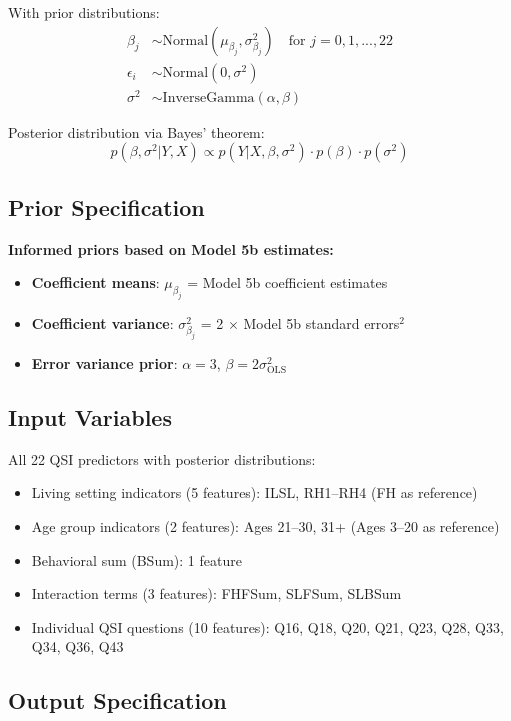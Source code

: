 With prior distributions:
\begin{align}
\beta_j &\sim \text{Normal}(\mu_{\beta_j}, \sigma^2_{\beta_j}) \quad \text{for } j = 0, 1, ..., 22 \\
\epsilon_i &\sim \text{Normal}(0, \sigma^2) \\
\sigma^2 &\sim \text{InverseGamma}(\alpha, \beta)
\end{align}

Posterior distribution via Bayes' theorem:
\begin{equation}
p(\beta, \sigma^2 | Y, X) \propto p(Y | X, \beta, \sigma^2) \cdot p(\beta) \cdot p(\sigma^2)
\end{equation}

\subsection{Prior Specification}

\textbf{Informed priors based on Model 5b estimates:}
\begin{itemize}
    \item \textbf{Coefficient means}: $\mu_{\beta_j}$ = Model 5b coefficient estimates
    \item \textbf{Coefficient variance}: $\sigma^2_{\beta_j}$ = 2 $\times$ Model 5b standard errors$^2$
    \item \textbf{Error variance prior}: $\alpha = 3$, $\beta = 2\sigma^2_{\text{OLS}}$
\end{itemize}

\subsection{Input Variables}

All 22 QSI predictors with posterior distributions:
\begin{itemize}
    \item Living setting indicators (5 features): ILSL, RH1--RH4 (FH as reference)
    \item Age group indicators (2 features): Ages 21--30, 31+ (Ages 3--20 as reference)
    \item Behavioral sum (BSum): 1 feature
    \item Interaction terms (3 features): FHFSum, SLFSum, SLBSum
    \item Individual QSI questions (10 features): Q16, Q18, Q20, Q21, Q23, Q28, Q33, Q34, Q36, Q43
\end{itemize}

\subsection{Output Specification}

